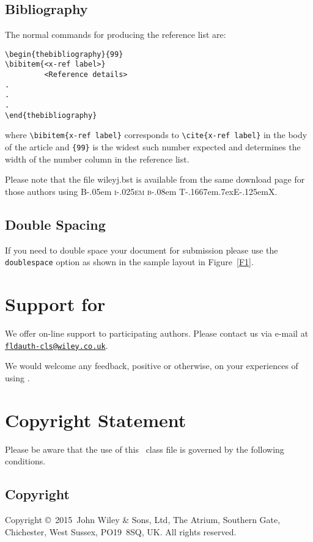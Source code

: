 \documentclass[times]{fldauth}
\newcommand\BibTeX{{\rmfamily B\kern-.05em \textsc{i\kern-.025em b}\kern-.08em
T\kern-.1667em\lower.7ex\hbox{E}\kern-.125emX}}
\def\volumeyear{2015}
\begin{document}
\subsection{Bibliography}
The normal commands for producing the reference list are:
\begin{verbatim}
\begin{thebibliography}{99}
\bibitem{<x-ref label>}
         <Reference details>
.
.
.
\end{thebibliography}
\end{verbatim}
where \verb"\bibitem{x-ref label}"
corresponds to \verb"\cite{x-ref label}" in the body of the article
and \verb"{99}" is the widest such number expected and determines
the width of the number column in the reference list.

Please note that the file \textsf{wileyj.bst} is available from
the same download page for those authors using \BibTeX.

\subsection{Double Spacing}
If you need to double space your document for submission please
use the \verb+doublespace+ option as shown in the sample layout in
Figure~\ref{F1}.

\section{Support for \textsf{\journalclass}}
We offer on-line support to participating authors. Please contact
us via e-mail at\\
\href{mailto:fldauth-cls@wiley.co.uk}{\texttt{fldauth-cls@wiley.co.uk}}.

We would welcome any feedback, positive or otherwise, on your
experiences of using \textsf{\journalclass}.

\section{Copyright Statement}
Please  be  aware that the use of  this \LaTeXe\ class file is
governed by the following conditions.

\subsection{Copyright}
Copyright \copyright\ \volumeyear\ John Wiley \& Sons, Ltd, The
Atrium, Southern Gate, Chichester, West Sussex, PO19~8SQ, UK. All
rights reserved.
\end{document}
